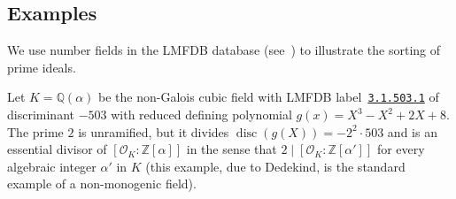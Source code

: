 \documentclass{article}
\def\Z{{\mathbb Z}}
\def\Q{{\mathbb Q}}
\def\OO{{\mathcal O}}
\def\p{{\mathfrak p}}
\DeclareMathOperator{\disc}{disc}
\DeclareMathOperator{\ord}{ord}
\begin{document}
%
%
%

\subsection{Examples}
We use number fields in the LMFDB database (see~\cite{lmfdb}) to
illustrate the sorting of prime ideals.

Let $K=\Q(\alpha)$ be the non-Galois cubic field with LMFDB
label~\href{www.lmfdb.org/NumberField/3.1.503.1}{\texttt{3.1.503.1}}
of discriminant $-503$ with reduced defining polynomial
$g(x)=X^3-X^2+2X+8$.  The prime $2$ is unramified, but it divides
$\disc(g(X))=-2^2\cdot 503$ and is an essential divisor of
$[\OO_K:\Z[\alpha]]$ in the sense that $2\mid[\OO_K:\Z[\alpha']]$ for
every algebraic integer $\alpha'$ in $K$ (this example, due to
Dedekind, is the standard example of a non-monogenic field).
\end{document}
